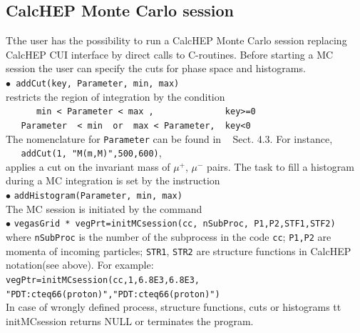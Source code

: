 \documentclass[12pt,a4paper]{article}
\begin{document}
\subsection{CalcHEP Monte Carlo  session}
\label{sec:sqme_MC}
Tthe user  has the possibility to run  a CalcHEP Monte Carlo session replacing  CalcHEP CUI interface by  direct calls to C-routines. Before starting a MC session  the user can specify the cuts for phase space and histograms.\\
$\bullet$\verb| addCut(key, Parameter, min, max)|\\
restricts the region  of integration by the condition\\
\verb|      min < Parameter < max ,              key>=0   | \\
\verb|   Parameter  < min  or  max < Parameter,  key<0| \\ 
The nomenclature for  {\tt Parameter}  can be found in ~ \cite{Belyaev:2012qa} Sect. 4.3. For instance,\\  
\verb|   addCut(1, "M(m,M)",500,600)|,\\
 applies a cut on the invariant mass of $\mu^+$, $\mu^-$ pairs.
The  task  to fill a histogram  during a MC integration  is set  by the  instruction \\
$\bullet$ \verb|addHistogram(Parameter, min, max)|\\

The MC session is initiated by the command \\
$\bullet$ \verb|vegasGrid * vegPrt=initMCsession(cc, nSubProc, P1,P2,STF1,STF2)|\\
where {\tt nSubProc} is the number of the subprocess  in the code {\tt cc};
{\tt P1,P2} are momenta of incoming particles; {\tt STR1}, {\tt STR2} are structure functions in  CalcHEP notation(see above).  For example: \\
{\small \verb|vegPtr=initMCsession(cc,1,6.8E3,6.8E3, "PDT:cteq66(proton)","PDT:cteq66(proton)") |}\\  
In case of wrongly defined process, structure functions, cuts or histograms {tt initMCsession}  returns NULL or terminates the program.   \\
\end{document}
